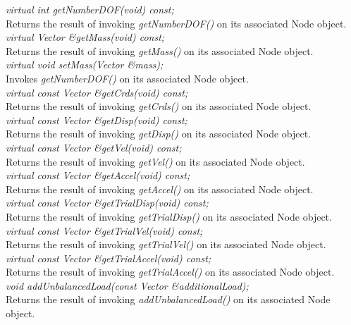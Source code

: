 {\em virtual int getNumberDOF(void) const;}\\
Returns the result of invoking {\em getNumberDOF()} on its associated
Node object. \\ 

{\em virtual Vector \&getMass(void) const;}\\
Returns the result of invoking {\em getMass()} on its associated
Node object. \\ 


{\em virtual void setMass(Vector \&mass);} \\
Invokes {\em getNumberDOF()} on its associated
Node object. \\ 


{\em virtual const Vector \&getCrds(void) const;}  \\
Returns the result of invoking {\em getCrds()} on its associated
Node object. \\ 

{\em  virtual const Vector \&getDisp(void) const;}  \\
Returns the result of invoking {\em getDisp()} on its associated
Node object. \\ 


{\em  virtual const Vector \&getVel(void) const;}  \\
Returns the result of invoking {\em getVel()} on its associated
Node object. \\ 


{\em  virtual const Vector \&getAccel(void) const;}  \\
Returns the result of invoking {\em getAccel()} on its associated
Node object. \\ 


{\em  virtual const Vector \&getTrialDisp(void) const;}  \\
Returns the result of invoking {\em getTrialDisp()} on its associated
Node object. \\ 


{\em  virtual const Vector \&getTrialVel(void) const;}  \\
Returns the result of invoking {\em getTrialVel()} on its associated
Node object. \\ 


{\em  virtual const Vector \&getTrialAccel(void) const;}  \\
Returns the result of invoking {\em getTrialAccel()} on its associated
Node object. \\ 


{\em void addUnbalancedLoad(const Vector \&additionalLoad);} \\
Returns the result of invoking {\em addUnbalancedLoad()} on its associated
Node object. \\ 

